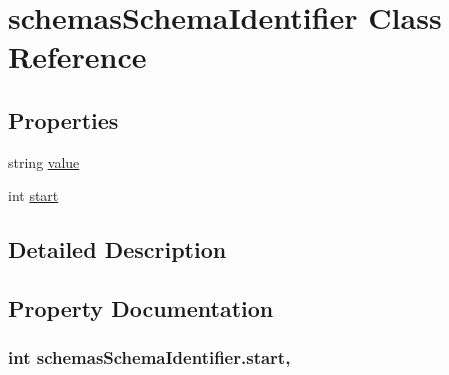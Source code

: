 \hypertarget{classschemas_schema_identifier}{}\section{schemas\+Schema\+Identifier Class Reference}
\label{classschemas_schema_identifier}


 


\subsection*{Properties}
\begin{DoxyCompactItemize}
\item 
string \hyperlink{classschemas_schema_identifier_a0dcd51bb1fb87d49765cf031b4425a46}{value}
\item 
int \hyperlink{classschemas_schema_identifier_a050bed554a3f4564b1e029d95d020905}{start}
\end{DoxyCompactItemize}


\subsection{Detailed Description}


\subsection{Property Documentation}
\subsubsection[{\texorpdfstring{start}{start}}]{\setlength{\rightskip}{0pt plus 5cm}int schemas\+Schema\+Identifier.\+start\hspace{0.3cm}{\ttfamily [get]}, {\ttfamily [set]}}\hypertarget{classschemas_schema_identifier_a050bed554a3f4564b1e029d95d020905}{}\label{classschemas_schema_identifier_a050bed554a3f4564b1e029d95d020905}




